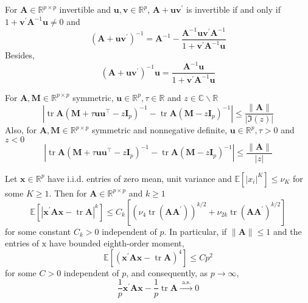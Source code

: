 \begin{lemma} \label{lem:sherman-morrison}
    For $\mathbf{A}\in\mathbb{R}^{p\times p}$ invertible and $\mathbf{u},\mathbf{v}\in\mathbb{R}^{p}$, $\mathbf{A}+\mathbf{u v}^{\prime}$ is invertible if and only if $1+\mathbf{v}^{\prime} \mathbf{A}^{-1} \mathbf{u} \neq 0$ and
    $$
        \left(\mathbf{A}+\mathbf{u v}^{\prime}\right)^{-1}=\mathbf{A}^{-1}-\frac{\mathbf{A}^{-1} \mathbf{u v}^{\prime} \mathbf{A}^{-1}}{1+\mathbf{v}^{\prime} \mathbf{A}^{-1} \mathbf{u}}
    $$
    Besides,
    $$
        \left(\mathbf{A}+\mathbf{u v}^{\prime}\right)^{-1} \mathbf{u}=\frac{\mathbf{A}^{-1} \mathbf{u}}{1+\mathbf{v}^{\prime} \mathbf{A}^{-1} \mathbf{u}}
    $$
\end{lemma}

\begin{lemma}
    For $\mathbf{A}, \mathbf{M} \in \mathbb{R}^{p \times p}$ symmetric, $\mathbf{u} \in \mathbb{R}^{p}, \tau \in \mathbb{R}$ and $z \in \mathbb{C} \backslash \mathbb{R}$
    $$
        \left|\operatorname{tr} \mathbf{A}\left(\mathbf{M}+\tau \mathbf{u u}^{\top}-z \mathbf{I}_{p}\right)^{-1}-\operatorname{tr} \mathbf{A}\left(\mathbf{M}-z \mathbf{I}_{p}\right)^{-1}\right| \leq \frac{\|\mathbf{A}\|}{|\Im(z)|}
    $$
    Also, for $\mathbf{A}, \mathbf{M} \in \mathbb{R}^{p \times p}$ symmetric and nonnegative definite, $\mathbf{u} \in \mathbb{R}^{p}, \tau>0$ and $z<0$
    $$
        \left|\operatorname{tr} \mathbf{A}\left(\mathbf{M}+\tau \mathbf{u} \mathbf{u}^{\top}-z \mathbf{I}_{p}\right)^{-1}-\operatorname{tr} \mathbf{A}\left(\mathbf{M}-z \mathbf{I}_{p}\right)^{-1}\right| \leq \frac{\|\mathbf{A}\|}{|z|}
    $$
\end{lemma}

\begin{lemma} \label{lem:quadratic-form-close-to-the-trace}
    Let $\mathbf{x} \in \mathbb{R}^{p}$ have i.i.d. entries of zero mean, unit variance and $\mathbb{E}\left[\left|x_{i}\right|^{K}\right] \leq \nu_{K}$ for some $K \geq 1 .$ Then for $\mathbf{A} \in \mathbb{R}^{p \times p}$ and $k \geq 1$
    $$
        \mathbb{E}\left[\left|\mathbf{x}^{\prime} \mathbf{A} \mathbf{x}-\operatorname{tr} \mathbf{A}\right|^{k}\right] \leq C_{k}\left[\left(\nu_{4} \operatorname{tr}\left(\mathbf{A} \mathbf{A}^{\prime}\right)\right)^{k / 2}+\nu_{2 k} \operatorname{tr}\left(\mathbf{A} \mathbf{A}^{\prime}\right)^{k / 2}\right]
    $$
    for some constant $C_{k}>0$ independent of $p .$ In particular, if $\|\mathbf{A}\| \leq 1$ and the entries of $\mathrm{x}$ have bounded eighth-order moment,
    $$
        \mathbb{E}\left[\left(\mathbf{x}^{\prime} \mathbf{A} \mathbf{x}-\operatorname{tr} \mathbf{A}\right)^{4}\right] \leq C p^{2}
    $$
    for some $C>0$ independent of $p$, and consequently, as $p \rightarrow \infty$,
    $$
        \frac{1}{p} \mathbf{x}^{\prime} \mathbf{A} \mathbf{x}-\frac{1}{p} \operatorname{tr} \mathbf{A} \stackrel{\text { a.s. }}{\longrightarrow} 0
    $$
\end{lemma}

